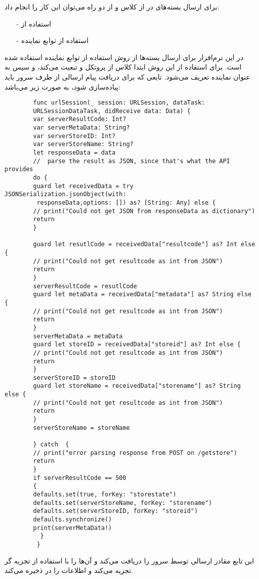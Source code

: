 \documentclass[oneside]{report}
\begin{document}
برای ارسال بسته‌های 
						{\normalsize {}}
	در 
							{\normalsize {}}
					از کلاس
											{\normalsize {}} 
						و	از دو راه می‌توان این کار را انجام داد:
\begin{itemize}
	\item[-]
	استفاده از 
							{\normalsize {}}
	\item[-]
	استفاده از توابع نماینده
\end{itemize}
	در این نرم‌افزار برای ارسال بسته‌ها از روش استفاده از توابع نماینده استفاده شده است. برای استفاده از این روش 
	ابتدا کلاس
							{\normalsize {}}
				از پروتکل 
										{\normalsize {}}
										و 
									{\normalsize {}}
				تبعیت می‌کند، و سپس به عنوان نماینده‌ تعریف می‌شود.
	تابعی که برای دریافت پیام ارسالی از طرف سرور باید پیاده‌سازی شود، به صورت زیر می‌باشد: 
	\begin{latin}
		\begin{verbatim}
		func urlSession(_ session: URLSession, dataTask: 
		URLSessionDataTask, didReceive data: Data) {
		var serverResultCode: Int?
		var serverMetaData: String?
		var serverStoreID: Int?
		var serverStoreName: String?
		let responseData = data
		//  parse the result as JSON, since that's what the API provides
		do {
		guard let receivedData = try JSONSerialization.jsonObject(with:
		 responseData,options: []) as? [String: Any] else {
		// print("Could not get JSON from responseData as dictionary")
		return
		}
		
		guard let resutlCode = receivedData["resultcode"] as? Int else {
		// print("Could not get resultcode as int from JSON")
		return
		}
		serverResultCode = resutlCode
		guard let metaData = receivedData["metadata"] as? String else {
		// print("Could not get resultcode as int from JSON")
		return
		}
		serverMetaData = metaData
		guard let storeID = receivedData["storeid"] as? Int else {
		// print("Could not get resultcode as int from JSON")
		return
		}
		serverStoreID = storeID
		guard let storeName = receivedData["storename"] as? String else {
		// print("Could not get resultcode as int from JSON")
		return
		}
		serverStoreName = storeName
		
		} catch  {
		// print("error parsing response from POST on /getstore")
		return
		}
		if serverResultCode == 500
		{
		defaults.set(true, forKey: "storestate")
		defaults.set(serverStoreName, forKey: "storename")
		defaults.set(serverStoreID, forKey: "storeid")
		defaults.synchronize()
		print(serverMetaData!)
		  }
		 }
		\end{verbatim}
		
	\end{latin}	
	این تابع مقادر ارسالی توسط سرور را دریافت می‌کند و آن‌ها را با استفاده از تجزیه گر 
								{\normalsize {}}
								تجزیه می‌کند و اطلاعات را در 
															{\normalsize {}}
															ذخیره می‌کند. 
	
\end{document}
